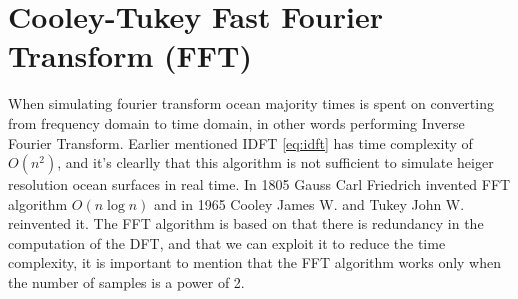 \section{Cooley-Tukey Fast Fourier Transform (FFT)}
When simulating fourier transform ocean majority times is spent on converting from frequency domain to time domain, in other words performing Inverse Fourier Transform.
Earlier mentioned IDFT \ref{eq:idft} has time complexity of $O(n^2)$, and it's clearlly that this algorithm is not sufficient to simulate heiger resolution ocean surfaces in real time.
In 1805 Gauss Carl Friedrich \cite{gauss1866} invented FFT algorithm $O(n\log n)$ and in 1965 Cooley James W. and Tukey John W. \cite{cooley1965} reinvented it.
The FFT algorithm is based on that there is redundancy in the computation of the DFT, and that we can exploit it to reduce the time complexity, it is important to mention that the FFT algorithm works only when the number of samples is a power of 2.

